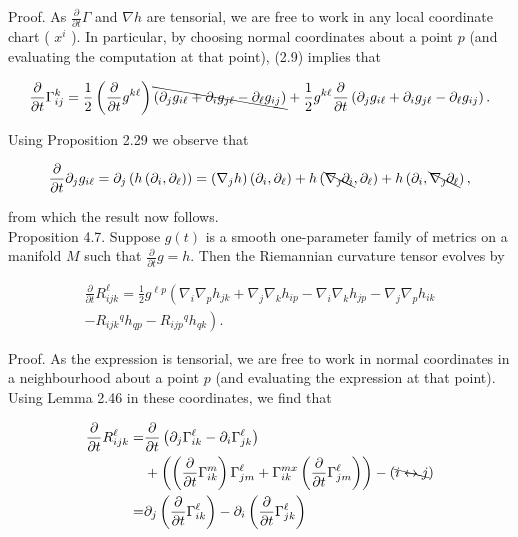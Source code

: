 \documentclass[10pt, letterpaper]{article}
\begin{document}
Proof. As $\frac{\partial}{\partial t} \Gamma$ and $\nabla h$ are tensorial, we are free to work in any local coordinate chart ( $x^{i}$ ). In particular, by choosing normal coordinates about a point $p$ (and evaluating the computation at that point), (2.9) implies that

$$
\frac{\partial}{\partial t} \Gamma_{i j}^{k}=\frac{1}{2}\left(\frac{\partial}{\partial t} g^{k \ell}\right) \bcancel{\left(\partial_{j} g_{i \ell}+\partial_{i} g_{j \ell}-\partial_{\ell} g_{i j}\right)}+\frac{1}{2} g^{k \ell} \frac{\partial}{\partial t}\left(\partial_{j} g_{i \ell}+\partial_{i} g_{j \ell}-\partial_{\ell} g_{i j}\right) .
$$

Using Proposition 2.29 we observe that

$$
\frac{\partial}{\partial t} \partial_{j} g_{i \ell}=\partial_{j}\left(h\left(\partial_{i}, \partial_{\ell}\right)\right)
=\left(\nabla_{j} h\right)\left(\partial_{i}, \partial_{\ell}\right)+h\left(\bcancel{\nabla_{\jmath} \partial_{i}}, \partial_{\ell}\right)+h\left(\partial_{i}, \bcancel{\nabla_{\jmath} \partial_{\ell}}\right),
$$

from which the result now follows.\\
Proposition 4.7. Suppose $g(t)$ is a smooth one-parameter family of metrics on a manifold $M$ such that $\frac{\partial}{\partial t} g=h$. Then the Riemannian curvature tensor evolves by

$$
\begin{gathered}
\frac{\partial}{\partial t} R_{i j k}^{\ell}=\frac{1}{2} g^{\ell p}\left(\nabla_{i} \nabla_{p} h_{j k}+\nabla_{j} \nabla_{k} h_{i p}-\nabla_{i} \nabla_{k} h_{j p}-\nabla_{j} \nabla_{p} h_{i k}\right. \\
\left.-R_{i j k}{ }^{q} h_{q p}-R_{i j p}{ }^{q} h_{q k}\right) .
\end{gathered}
$$

Proof. As the expression is tensorial, we are free to work in normal coordinates in a neighbourhood about a point $p$ (and evaluating the expression at that point). Using Lemma 2.46 in these coordinates, we find that

$$
\begin{aligned}
\frac{\partial}{\partial t} R_{i j k}^{\ell}= & \frac{\partial}{\partial t}\left(\partial_{j} \Gamma_{i k}^{\ell}-\partial_{i} \Gamma_{j k}^{\ell}\right) \\
& +\left(\left(\frac{\partial}{\partial t} \Gamma_{i k}^{m}\right) \Gamma_{j m}^{\ell}+\Gamma_{i k}^{m x}\left(\frac{\partial}{\partial t} \Gamma_{j m}^{\ell}\right)\right)-(\bcancel{i \leftrightarrow j}) \\
= & \partial_{j}\left(\frac{\partial}{\partial t} \Gamma_{i k}^{\ell}\right)-\partial_{i}\left(\frac{\partial}{\partial t} \Gamma_{j k}^{\ell}\right)
\end{aligned}
$$
\end{document}
